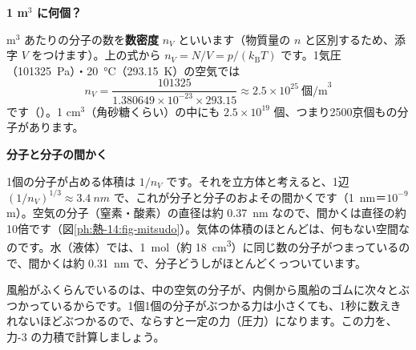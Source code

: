 \noindent\textbf{1 m$^3$ に何個？}\par{} m$^3$ あたりの分子の数を\textbf{数密度} $n_V$ といいます（物質量の $n$ と区別するため、添字 $V$ をつけます）。上の式から $n_V=N/V=p/(k_{\mathrm B}T)$ です。1気圧（\qty{101325}{Pa}）・\qty{20}{\celsius}（\qty{293.15}{K}）の空気では
\[ n_V=\frac{\num{101325}}{1.380649\times10^{-23}\times293.15}\approx2.5\times10^{25}\ \text{個/m}^3 \]
です（\nobreak{}\nobreak）。1 cm$^3$（角砂糖くらい）の中にも $2.5\times10^{19}$ 個、つまり2500京個もの分子があります。

\begin{bkfigure}
\label{ph:熱-14:fig-mitsudo}
\end{bkfigure}

\noindent\textbf{分子と分子の間かく}\par\nobreak
1個の分子が占める体積は $1/n_V$ です。それを立方体と考えると、1辺 $(1/n_V)^{1/3}\approx\qty{3.4}{nm}$ で、これが分子と分子のおよその間かくです（\qty{1}{nm}＝$10^{-9}$\,m）。空気の分子（窒素・酸素）の直径は約 \qty{0.37}{nm} なので、間かくは直径の約10倍です（図\ref{ph:熱-14:fig-mitsudo}）。気体の体積のほとんどは、何もない空間なのです。水（液体）では、\qty{1}{mol}（約 \qty{18}{cm^3}）に同じ数の分子がつまっているので、間かくは約 \qty{0.31}{nm} で、分子どうしがほとんどくっついています。


\leavevmode\label{ph:熱-14:sec2}風船がふくらんでいるのは、中の空気の分子が、内側から風船のゴムに次々とぶつかっているからです。1個1個の分子がぶつかる力は小さくても、1秒に数えきれないほどぶつかるので、ならすと一定の力（圧力）になります。この力を、力-3 の力積で計算しましょう。

